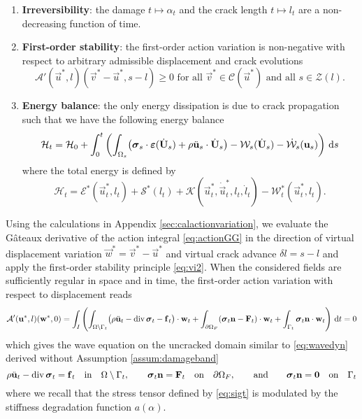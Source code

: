 \begin{model} \label{model:dynagraddamanew}
\begin{enumerate}
\item \textbf{Irreversibility}: the damage $t\mapsto\alpha_t$ and the crack length $t\mapsto l_t$ are a non-decreasing function of time.
\item \textbf{First-order stability}: the first-order action variation is non-negative with respect to arbitrary admissible displacement and crack evolutions
\begin{equation} \label{eq:vi2}
\mathcal{A}'(\vec{u}^*,l)(\vec{v}^*-\vec{u}^*,s-l)\geq 0\text{ for all $\vec{v}^*\in\mathcal{C}(\vec{u}^*)$ and all $s\in\mathcal{Z}(l)$}.
\end{equation}
\item \textbf{Energy balance}: the only energy dissipation is due to crack propagation such that we have the following energy balance
\begin{equation} \label{eq:dyngdeb2}
\mathcal{H}_t=\mathcal{H}_0+\int_0^t\left(\int_{\Omega_s}\bigl(\sig_s\cdot\eps(\dot{\vec{U}}_s)+\rho\ddot{\vec{u}}_s\cdot\dot{\vec{U}}_s\bigr)-\mathcal{W}_s(\dot{\vec{U}}_s)-\dot{\mathcal{W}}_s(\vec{u}_s)\right)\D{s}
\end{equation}
where the total energy is defined by
\begin{equation}
\mathcal{H}_t=\mathcal{E}^*(\vec{u}_t^*,l_t)+\mathcal{S}^*(l_t)+\mathcal{K}(\vec{u}_t^*,\dot{\vec{u}}_t^*,l_t,\dot{l}_t)-\mathcal{W}_t^*(\vec{u}_t^*,l_t).
\end{equation}
\end{enumerate}
\end{model}

Using the calculations in Appendix \ref{sec:calactionvariation}, we evaluate the Gâteaux derivative of the action integral \eqref{eq:actionGG} in the direction of virtual displacement variation $\vec{w}^*=\vec{v}^*-\vec{u}^*$ and virtual crack advance $\delta l=s-l$ and apply the first-order stability principle \eqref{eq:vi2}. When the considered fields are sufficiently regular in space and in time, the first-order action variation with respect to displacement reads
\[
\mathcal{A}'(\vec{u}^*,l)(\vec{w}^*,0)=\int_I\left(\int_\domaint\bigl(\rho\ddot{\vec{u}}_t-\div\sig_t-\vec{f}_t\bigr)\cdot\vec{w}_t+\int_{\partial\Omega_F}(\sig_t\vec{n}-\vec{F}_t)\cdot\vec{w}_t+\int_{\Gamma_t}\sig_t\vec{n}\cdot\vec{w}_t\right)\D{t}=0
\]
which gives the wave equation on the uncracked domain similar to \eqref{eq:wavedyn} derived without Assumption \ref{assum:damageband} 
\begin{equation} \label{eq:waveequation}
\rho\ddot{\vec{u}}_t-\div\sig_t=\vec{f}_t\quad\text{in}\quad\domaint,\qquad\sig_t\vec{n}=\vec{F}_t\quad\text{on}\quad\partial\Omega_F,\qquad\text{and}\qquad\sig_t\vec{n}=\vec{0}\quad\text{on}\quad\Gamma_t
\end{equation}
where we recall that the stress tensor defined by \eqref{eq:sigt} is modulated by the stiffness degradation function $a(\alpha)$.

